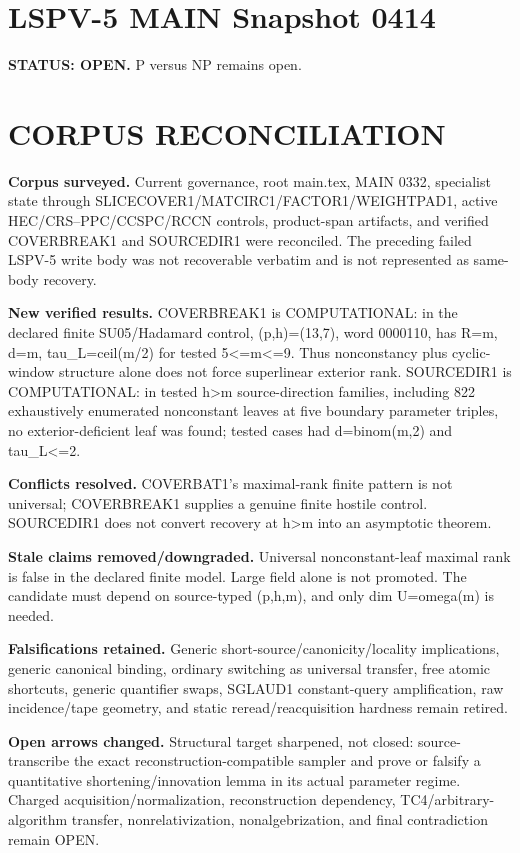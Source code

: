 \documentclass[11pt]{article}\usepackage[margin=.86in]{geometry}\usepackage{amsmath,amssymb}
\begin{document}
\section*{LSPV-5 MAIN Snapshot 0414}
\textbf{STATUS: OPEN.} P versus NP remains open.
\section*{CORPUS RECONCILIATION}
\textbf{Corpus surveyed.} Current governance, root main.tex, MAIN 0332, specialist state through SLICECOVER1/MATCIRC1/FACTOR1/WEIGHTPAD1, active HEC/CRS--PPC/CCSPC/RCCN controls, product-span artifacts, and verified COVERBREAK1 and SOURCEDIR1 were reconciled. The preceding failed LSPV-5 write body was not recoverable verbatim and is not represented as same-body recovery.

\textbf{New verified results.} COVERBREAK1 is COMPUTATIONAL: in the declared finite SU05/Hadamard control, (p,h)=(13,7), word 0000110, has R=m, d=m, tau_L=ceil(m/2) for tested 5<=m<=9. Thus nonconstancy plus cyclic-window structure alone does not force superlinear exterior rank. SOURCEDIR1 is COMPUTATIONAL: in tested h>m source-direction families, including 822 exhaustively enumerated nonconstant leaves at five boundary parameter triples, no exterior-deficient leaf was found; tested cases had d=binom(m,2) and tau_L<=2.

\textbf{Conflicts resolved.} COVERBAT1's maximal-rank finite pattern is not universal; COVERBREAK1 supplies a genuine finite hostile control. SOURCEDIR1 does not convert recovery at h>m into an asymptotic theorem.

\textbf{Stale claims removed/downgraded.} Universal nonconstant-leaf maximal rank is false in the declared finite model. Large field alone is not promoted. The candidate must depend on source-typed (p,h,m), and only dim U=omega(m) is needed.

\textbf{Falsifications retained.} Generic short-source/canonicity/locality implications, generic canonical binding, ordinary switching as universal transfer, free atomic shortcuts, generic quantifier swaps, SGLAUD1 constant-query amplification, raw incidence/tape geometry, and static reread/reacquisition hardness remain retired.

\textbf{Open arrows changed.} Structural target sharpened, not closed: source-transcribe the exact reconstruction-compatible sampler and prove or falsify a quantitative shortening/innovation lemma in its actual parameter regime. Charged acquisition/normalization, reconstruction dependency, TC4/arbitrary-algorithm transfer, nonrelativization, nonalgebrization, and final contradiction remain OPEN.
\end{document}

